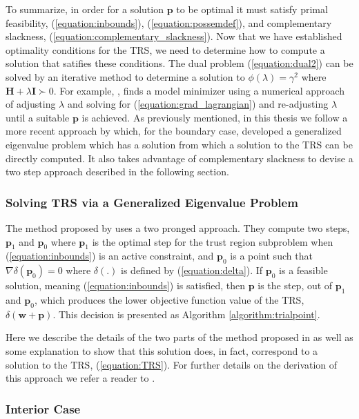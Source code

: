 \documentclass[letterpaper,12pt,titlepage,oneside,final]{book}
\begin{document}
	To summarize, in order for a solution $\mathbf{p}$ to be optimal it must satisfy primal feasibility, (\ref{equation:inbounds}), (\ref{equation:possemdef}), and complementary slackness, (\ref{equation:complementary_slackness}). Now that we have established optimality conditions for the TRS, we need to determine how to compute a solution that satifies these conditions. The dual problem (\ref{equation:dual2}) can be solved by an iterative method to determine a solution to $\phi(\lambda) = \gamma^{2}$ where $\mathbf{H} + \lambda \mathbf{I} \succ 0$. For example, \cite{TRM.book}, finds a model minimizer using a numerical approach of adjusting $\lambda$ and solving for (\ref{equation:grad_lagrangian}) and re-adjusting $\lambda$ until a suitable $\mathbf{p}$ is achieved. As previously mentioned, in this thesis we follow a more recent approach by \cite{adachi.paper} which, for the boundary case, developed a generalized eigenvalue problem which has a solution from which a solution to the TRS can be directly computed. It also takes advantage of complementary slackness to devise a two step approach described in the following section. 
	
	\subsubsection{Solving TRS via a Generalized Eigenvalue Problem}
	
	The method proposed by \cite{adachi.paper} uses a two pronged approach. They compute two steps, $\mathbf{p}_{1}$ and $\mathbf{p}_{0}$ where $\mathbf{p}_{1}$ is the optimal step for the trust region subproblem when (\ref{equation:inbounds}) is an active constraint, and $\mathbf{p}_{0}$ is a point such that $\nabla\delta(\mathbf{p}_{0}) = 0$ where $\delta(.)$ is defined by (\ref{equation:delta}). If $\mathbf{p}_{0}$ is a feasible solution, meaning (\ref{equation:inbounds}) is satisfied, then $\mathbf{p}$ is the step, out of $\mathbf{p}_{1}$ and $\mathbf{p}_{0}$, which produces the lower objective function value of the TRS, $\delta(\mathbf{w + p})$. This decision is presented as Algorithm \ref{algorithm:trialpoint}.
	
	Here we describe the details of the two parts of the method proposed in \cite{adachi.paper} as well as some explanation to show that this solution does, in fact, correspond to 
	a solution to the TRS, (\ref{equation:TRS}). For further details on the derivation of this approach we refer a reader to \cite{adachi.paper}. 
	
	\subsubsection{Interior Case}
	
\end{document}
